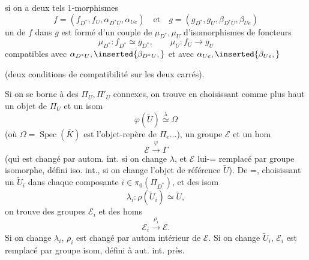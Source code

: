 

si on a deux tels $1$-morphismes
\[
f=(f_{D^*},f_U,\alpha_{D^*U},\alpha_{Ue})
\quad\text{et}\quad
g=(g_{D^*},g_U,\beta_{D^*U},\beta_{Ue})
\]
un  de $f$ dans $g$ est formé d'un couple de $\mu_{D^*},\mu_U$ d'isomorphismes de foncteurs
\[
\mu_{D^*}:f_{D^*}\simeq g_{D^*},\qquad
\mu_U:f_U\longrightarrow g_U
\]
compatibles avec $\alpha_{D^*U},\inserted{\beta_{D^*U},}$ et avec $\alpha_{Ue},\inserted{\beta_{Ue},}$ 


 (deux conditions de compatibilité sur les deux carrés).

Si on  se borne à des $\Pi_U,\Pi'_U$ connexes, on trouve en choisissant comme plus haut un objet  de $\Pi_U$ et un isom
\[
\boxed{\varphi(\widetilde U)\overset{\lambda}{\simeq}\Omega}
\]
(où $\Omega=\operatorname{Spec}(\bar K)$ est l'objet-repère de $\Pi_e\ldots$), un groupe $\mathcal E$ et un hom
\[
\mathcal E\xrightarrow{\varphi}\Gamma
\]
(qui est changé par autom. int. si on change $\lambda$, et $\mathcal E$ lui-= remplacé par groupe isomorphe,  défini  iso. int., si on change l'objet de référence $\widetilde U$). De =, choisissant un $\widetilde U_i$ dans chaque composante $i\in\pi_0(\Pi_{D^*})$, et des isom
\[
\lambda_i:\rho(\widetilde U_i)\simeq\widetilde U,
\]
on trouve des groupes $\mathcal E_i$ et des homs
\[
\mathcal E_i\xrightarrow{\rho_i}\mathcal E.
\]
Si on change $\lambda_i$, $\rho_i$ est changé par autom intérieur de $\mathcal E$. Si on change $\widetilde U_i$, $\mathcal E_i$ est remplacé par groupe isom,  défini à aut. int. près.

